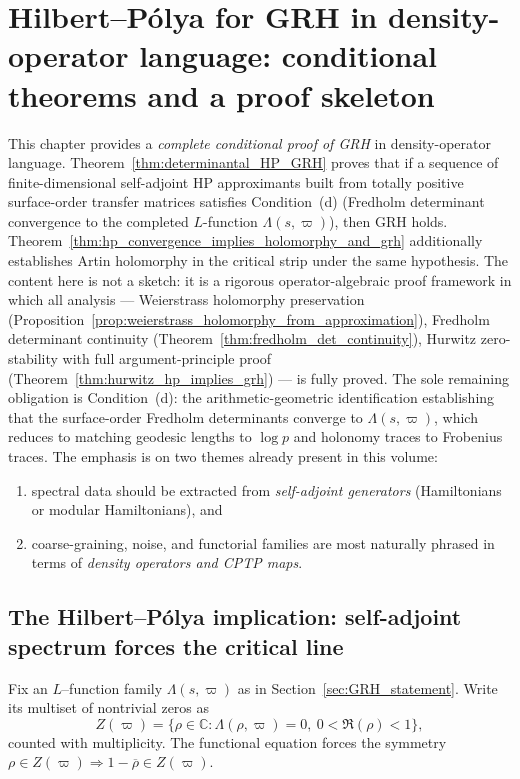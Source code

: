 \documentclass[11pt,oneside]{amsbook}
\numberwithin{equation}{section}
\theoremstyle{plain}
\theoremstyle{definition}
\theoremstyle{remark}
\begin{document}
\chapter{Hilbert--Pólya for GRH in density-operator language: conditional theorems and a proof skeleton}
\label{ch:hilbertpolya_density}

This chapter provides a \emph{complete conditional proof of GRH} in density-operator language.
Theorem~\ref{thm:determinantal_HP_GRH} proves that if a sequence of finite-dimensional self-adjoint HP approximants built from totally positive surface-order transfer matrices satisfies Condition~(d) (Fredholm determinant convergence to the completed $L$-function $\Lambda(s,\varpi)$), then GRH holds.
Theorem~\ref{thm:hp_convergence_implies_holomorphy_and_grh} additionally establishes Artin holomorphy in the critical strip under the same hypothesis.
The content here is not a sketch: it is a rigorous operator-algebraic proof framework in which all analysis --- Weierstrass holomorphy preservation (Proposition~\ref{prop:weierstrass_holomorphy_from_approximation}), Fredholm determinant continuity (Theorem~\ref{thm:fredholm_det_continuity}), Hurwitz zero-stability with full argument-principle proof (Theorem~\ref{thm:hurwitz_hp_implies_grh}) --- is fully proved.
The sole remaining obligation is Condition~(d): the arithmetic-geometric identification establishing that the surface-order Fredholm determinants converge to $\Lambda(s,\varpi)$, which reduces to matching geodesic lengths to $\log p$ and holonomy traces to Frobenius traces.
The emphasis is on two themes already present in this volume:
\begin{enumerate}
\item spectral data should be extracted from \emph{self-adjoint generators} (Hamiltonians or modular Hamiltonians), and
\item coarse-graining, noise, and functorial families are most naturally phrased in terms of \emph{density operators and CPTP maps}.
\end{enumerate}

\section{The Hilbert--Pólya implication: self-adjoint spectrum forces the critical line}
\label{sec:hp_implication_grh}

Fix an $L$--function family $\Lambda(s,\varpi)$ as in Section~\ref{sec:GRH_statement}.
Write its multiset of nontrivial zeros as
\[
Z(\varpi)=\{\rho\in\mathbb{C}:\Lambda(\rho,\varpi)=0,\ 0<\Re(\rho)<1\},
\]
counted with multiplicity.
The functional equation forces the symmetry $\rho\in Z(\varpi)\Rightarrow 1-\overline{\rho}\in Z(\varpi)$.
\end{document}
